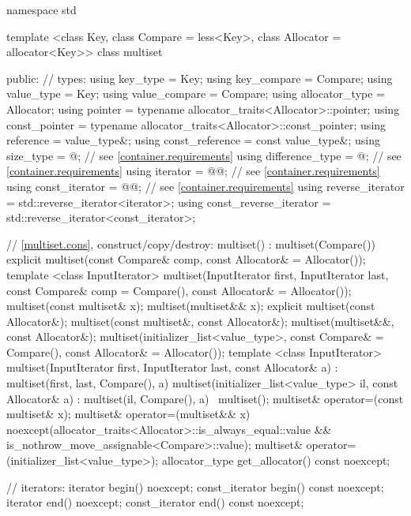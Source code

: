 \begin{codeblock}
namespace std {
  template <class Key, class Compare = less<Key>,
            class Allocator = allocator<Key>>
  class multiset {
  public:
    // types:
    using key_type               = Key;
    using key_compare            = Compare;
    using value_type             = Key;
    using value_compare          = Compare;
    using allocator_type         = Allocator;
    using pointer                = typename allocator_traits<Allocator>::pointer;
    using const_pointer          = typename allocator_traits<Allocator>::const_pointer;
    using reference              = value_type&;
    using const_reference        = const value_type&;
    using size_type              = @\impdef@; // see \ref{container.requirements}
    using difference_type        = @\impdef@; // see \ref{container.requirements}
    using iterator               = @@; // see \ref{container.requirements}
    using const_iterator         = @@; // see \ref{container.requirements}
    using reverse_iterator       = std::reverse_iterator<iterator>;
    using const_reverse_iterator = std::reverse_iterator<const_iterator>;

    // \ref{multiset.cons}, construct/copy/destroy:
    multiset() : multiset(Compare()) { }
    explicit multiset(const Compare& comp, const Allocator& = Allocator());
    template <class InputIterator>
      multiset(InputIterator first, InputIterator last,
               const Compare& comp = Compare(), const Allocator& = Allocator());
    multiset(const multiset& x);
    multiset(multiset&& x);
    explicit multiset(const Allocator&);
    multiset(const multiset&, const Allocator&);
    multiset(multiset&&, const Allocator&);
    multiset(initializer_list<value_type>, const Compare& = Compare(),
             const Allocator& = Allocator());
    template <class InputIterator>
      multiset(InputIterator first, InputIterator last, const Allocator& a)
        : multiset(first, last, Compare(), a) { }
    multiset(initializer_list<value_type> il, const Allocator& a)
      : multiset(il, Compare(), a) { }
    ~multiset();
    multiset& operator=(const multiset& x);
    multiset& operator=(multiset&& x)
      noexcept(allocator_traits<Allocator>::is_always_equal::value &&
               is_nothrow_move_assignable<Compare>::value);
    multiset& operator=(initializer_list<value_type>);
    allocator_type get_allocator() const noexcept;

    // iterators:
    iterator               begin() noexcept;
    const_iterator         begin() const noexcept;
    iterator               end() noexcept;
    const_iterator         end() const noexcept;

}}
\end{codeblock}
